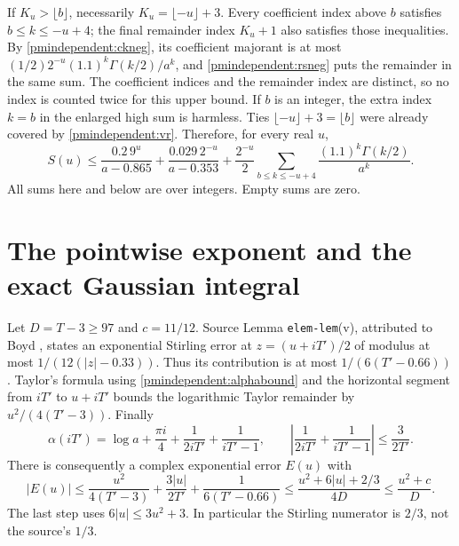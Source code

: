 \documentclass[11pt]{article}
\begin{document}
If $K_u>\lfloor b\rfloor$, necessarily $K_u=\lfloor-u\rfloor+3$.
Every coefficient index above $b$ satisfies $b\le k\le-u+4$;
the final remainder index $K_u+1$ also satisfies those inequalities.
By \eqref{pmindependent:ckneg}, its coefficient majorant is at most
$(1/2)2^{-u}(1.1)^k\Gamma(k/2)/a^k$, and \eqref{pmindependent:rsneg}
puts the remainder in the same sum. The coefficient indices and
the remainder index are distinct, so no index is counted twice
for this upper bound. If $b$ is an integer, the extra index $k=b$
in the enlarged high sum is harmless. Ties
$\lfloor-u\rfloor+3=\lfloor b\rfloor$ were already covered by
\eqref{pmindependent:vr}. Therefore, for every real $u$,
\begin{equation}\label{pmindependent:Sbound}
 S(u)\le\frac{0.2\,9^u}{a-0.865}
       +\frac{0.029\,2^{-u}}{a-0.353}
       +\frac{2^{-u}}2\sum_{b\le k\le-u+4}
                              \frac{(1.1)^k\Gamma(k/2)}{a^k}.
\end{equation}
All sums here and below are over integers. Empty sums are zero.

\section{The pointwise exponent and the exact Gaussian integral}

Let $D=T-3\ge97$ and $c=11/12$. Source Lemma
\texttt{elem-lem}(v), attributed to Boyd \cite{pmindependent:polymath,pmindependent:boyd},
states an exponential Stirling error at $z=(u+iT')/2$ of modulus
at most $1/(12(|z|-0.33))$. Thus its contribution is at most
$1/(6(T'-0.66))$. Taylor's formula using \eqref{pmindependent:alphabound}
and the horizontal segment from $iT'$ to $u+iT'$ bounds the
logarithmic Taylor remainder by $u^2/(4(T'-3))$. Finally
\[
 \alpha(iT')=\log a+\frac{\pi i}4+\frac1{2iT'}+\frac1{iT'-1},
 \qquad
 \left|\frac1{2iT'}+\frac1{iT'-1}\right|\le\frac3{2T'}.
\]
There is consequently a complex exponential error $E(u)$ with
\begin{equation}\label{pmindependent:Ebound}
 |E(u)|\le\frac{u^2}{4(T'-3)}+\frac{3|u|}{2T'}
                      +\frac1{6(T'-0.66)}
 \le\frac{u^2+6|u|+2/3}{4D}
 \le\frac{u^2+c}{D}.
\end{equation}
The last step uses $6|u|\le3u^2+3$. In particular the Stirling
numerator is $2/3$, not the source's $1/3$.
\end{document}
